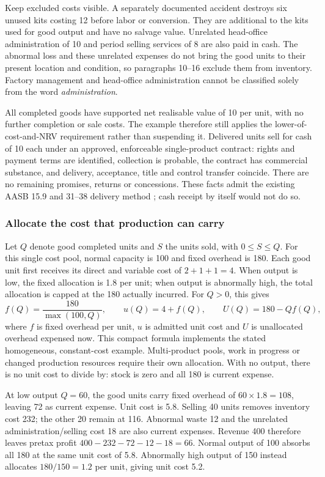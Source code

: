 Keep excluded costs visible. A separately documented accident destroys six
unused kits costing 12 before labor or conversion. They are additional to
the kits used for good output and have no salvage value. Unrelated
head-office administration of 10 and period selling services of 8 are also
paid in cash. The abnormal loss and these unrelated expenses do not bring
the good units to their present location and condition, so paragraphs
10--16 exclude them from inventory. Factory management and head-office
administration cannot be classified solely from the word \emph{administration}.

All completed goods have supported net realisable value of 10 per unit,
with no further completion or sale costs. The example therefore still
applies the lower-of-cost-and-NRV requirement rather than suspending it.
Delivered units sell for cash of 10 each under an approved, enforceable
single-product contract: rights and payment terms are identified,
collection is probable, the contract has commercial substance, and
delivery, acceptance, title and control transfer coincide. There are no
remaining promises, returns or concessions. These facts admit the
existing AASB 15.9 and 31--38 delivery method \citep{aasb15dated}; cash
receipt by itself would not do so.

\subsubsection{Allocate the cost that production can carry}

Let \(Q\) denote good completed units and \(S\) the units sold, with
\(0\leq S\leq Q\). For this single cost pool, normal capacity is 100
and fixed overhead is 180. Each good unit first receives its direct and
variable cost of \(2+1+1=4\). When output is low, the fixed allocation
is 1.8 per unit; when output is abnormally high, the total allocation is
capped at the 180 actually incurred. For \(Q>0\), this gives
\[
 f(Q)=\frac{180}{\max(100,Q)},\qquad
 u(Q)=4+f(Q),\qquad
 U(Q)=180-Qf(Q),
\]
where \(f\) is fixed overhead per unit, \(u\) is admitted unit cost
and \(U\) is unallocated overhead expensed now. This compact formula
implements the stated homogeneous, constant-cost example. Multi-product
pools, work in progress or changed production resources require their own
allocation. With no output, there is no unit cost to divide by: stock is
zero and all 180 is current expense.

At low output \(Q=60\), the good units carry fixed overhead of
\(60\times1.8=108\), leaving 72 as current expense. Unit cost is 5.8.
Selling 40 units removes inventory cost 232; the other 20 remain at 116.
Abnormal waste 12 and the unrelated administration/selling cost 18 are
also current expenses. Revenue 400 therefore leaves pretax profit
\(400-232-72-12-18=66\). Normal output of 100 absorbs all 180 at
the same unit cost of 5.8. Abnormally high output of 150 instead allocates
\(180/150=1.2\) per unit, giving unit cost 5.2.


